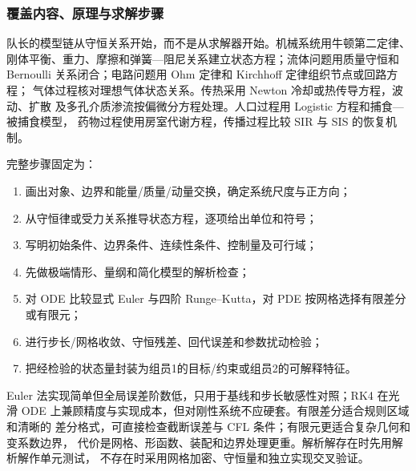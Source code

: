\subsubsection{覆盖内容、原理与求解步骤}

队长的模型链从守恒关系开始，而不是从求解器开始。机械系统用牛顿第二定律、
刚体平衡、重力、摩擦和弹簧—阻尼关系建立状态方程；流体问题用质量守恒和
Bernoulli 关系闭合；电路问题用 Ohm 定律和 Kirchhoff 定律组织节点或回路方程；
气体过程核对理想气体状态关系。传热采用 Newton 冷却或热传导方程，波动、扩散
及多孔介质渗流按偏微分方程处理。人口过程用 Logistic 方程和捕食—被捕食模型，
药物过程使用房室代谢方程，传播过程比较 SIR 与 SIS 的恢复机制。

完整步骤固定为：
\begin{enumerate}
  \item 画出对象、边界和能量/质量/动量交换，确定系统尺度与正方向；
  \item 从守恒律或受力关系推导状态方程，逐项给出单位和符号；
  \item 写明初始条件、边界条件、连续性条件、控制量及可行域；
  \item 先做极端情形、量纲和简化模型的解析检查；
  \item 对 ODE 比较显式 Euler 与四阶 Runge--Kutta，对 PDE 按网格选择有限差分或有限元；
  \item 进行步长/网格收敛、守恒残差、回代误差和参数扰动检验；
  \item 把经检验的状态量封装为组员1的目标/约束或组员2的可解释特征。
\end{enumerate}

Euler 法实现简单但全局误差阶数低，只用于基线和步长敏感性对照；RK4 在光滑 ODE
上兼顾精度与实现成本，但对刚性系统不应硬套。有限差分适合规则区域和清晰的
差分格式，可直接检查截断误差与 CFL 条件；有限元更适合复杂几何和变系数边界，
代价是网格、形函数、装配和边界处理更重。解析解存在时先用解析解作单元测试，
不存在时采用网格加密、守恒量和独立实现交叉验证。

